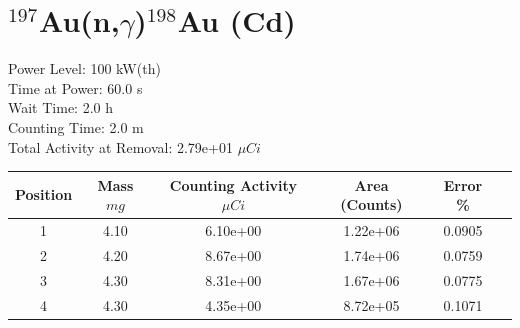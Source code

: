 \newpage

\section*{ $^{197}$Au(n,$\gamma$)$^{198}$Au (Cd) }

Power Level: 100 kW(th) \\
Time at Power: 60.0 s \\
Wait Time:  2.0 h \\
Counting Time:  2.0 m \\
Total Activity at Removal: 2.79e+01 $\mu Ci$

\begin{table}[h]
\centering
\begin{tabular}{ |c|c|c|c|c|c| }
 \hline
 Position & Mass $mg$ & Counting Activity $\mu Ci$ & Area (Counts) & Error \% \\
 \hline 
 1 & 4.10 & 6.10e+00 & 1.22e+06 & 0.0905 \\ 
\hline
 2 & 4.20 & 8.67e+00 & 1.74e+06 & 0.0759 \\ 
\hline
 3 & 4.30 & 8.31e+00 & 1.67e+06 & 0.0775 \\ 
\hline
 4 & 4.30 & 4.35e+00 & 8.72e+05 & 0.1071 \\ 
\hline
\end{tabular}
\end{table}

